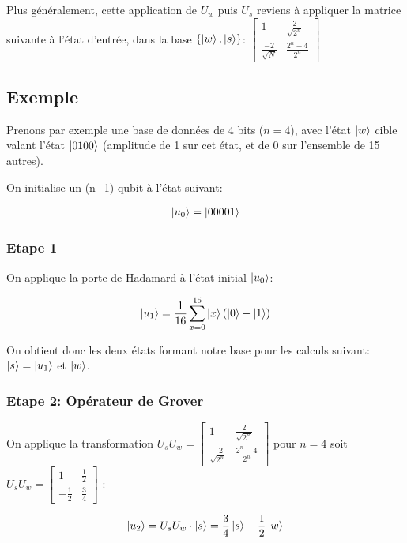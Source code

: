 Plus généralement, cette application de $U_w$ puis $U_s$ reviens à appliquer la matrice suivante à l'état d'entrée, dans la base $\{\ket{w}, \ket{s}\}$:
$
\begin{bmatrix}
    1 & \frac{2}{\sqrt{2^n}} \\ \frac{-2}{\sqrt{N}} & \frac{2^n - 4}{2^n}
\end{bmatrix}
$

\subsection{Exemple}
Prenons par exemple une base de données de 4 bits ($n=4$), avec l'état $\ket{w}$ cible valant l'état $\ket{0100}$ (amplitude de 1 sur cet état, et de 0 sur l'ensemble de 15 autres).

On initialise un (n+1)-qubit à l'état suivant:

\begin{align}
  \ket{u_0} = \ket{00001}
\end{align}

\subsubsection*{Etape 1}
On applique la porte de Hadamard à l'état initial $\ket{u_0}$:

\begin{align}
  \ket{u_1} = \frac{1}{16} \displaystyle\sum_{x=0}^{15} \ket{x}(\ket{0} - \ket{1})
\end{align}

On obtient donc les deux états formant notre base pour les calculs suivant: $\ket{s} = \ket{u_1}$ et $\ket{w}$.

\subsubsection*{Etape 2: Opérateur de Grover}

On applique la transformation $U_sU_w = \begin{bmatrix}
  1 & \frac{2}{\sqrt{2^n}} \\ \frac{-2}{\sqrt{2^n}} & \frac{2^n-4}{2^n}
\end{bmatrix}$ pour $n=4$ soit $U_sU_w = \begin{bmatrix}
  1 & \frac{1}{2} \\ -\frac{1}{2} & \frac{3}{4}
\end{bmatrix}$ :

\begin{align}
  \ket{u_2} = U_sU_w \cdot \ket{s} = \frac{3}{4}\ket{s} + \frac{1}{2}\ket{w}
\end{align}

